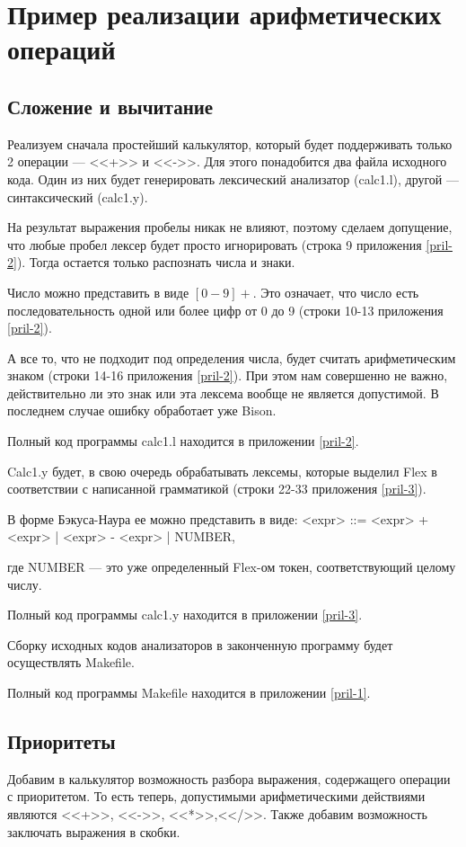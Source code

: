 \documentclass[bachelor, och, coursework, times]{SCWorks}
\begin{document}
\section{Пример реализации арифметических операций}
\subsection{Сложение и вычитание}
Реализуем сначала простейший калькулятор, который будет поддерживать только 2 операции --- <<+>> и <<->>.
Для этого понадобится два файла исходного кода. Один из них будет генерировать лексический анализатор (calc1.l), другой --- синтаксический (calc1.y).

На результат выражения пробелы никак не влияют, поэтому сделаем допущение, что любые пробел лексер будет просто игнорировать (строка 9 приложения \ref{pril-2}). Тогда остается только распознать числа и знаки.

Число можно представить в виде $[0-9]+$. Это означает, что число есть последовательность одной или более цифр от 0 до 9 (строки 10-13 приложения \ref{pril-2}).

А все то, что не подходит под определения числа, будет считать арифметическим знаком (строки 14-16 приложения \ref{pril-2}). При этом нам совершенно не важно, действительно ли это знак или эта лексема вообще не является допустимой. В последнем случае ошибку обработает уже Bison.

Полный код программы calc1.l находится в приложении \ref{pril-2}.

Calc1.y будет, в свою очередь обрабатывать лексемы, которые выделил Flex в соответствии с написанной грамматикой (строки 22-33 приложения \ref{pril-3}).

В форме Бэкуса-Наура ее можно представить в виде: \linebreak
<expr> ::= <expr> + <expr> | <expr> - <expr> | NUMBER,

где NUMBER --- это уже определенный Flex-ом токен, соответствующий целому числу.

Полный код программы calc1.y находится в приложении \ref{pril-3}.

Сборку исходных кодов анализаторов в законченную программу будет осуществлять Makefile.

Полный код программы Makefile находится в приложении \ref{pril-1}.

\subsection{Приоритеты}
Добавим в калькулятор возможность разбора выражения, содержащего операции с приоритетом. То есть теперь, допустимыми арифметическими действиями являются <<+>>, <<->>, <<*>>,<</>>. Также добавим возможность заключать выражения в скобки.
\end{document}
